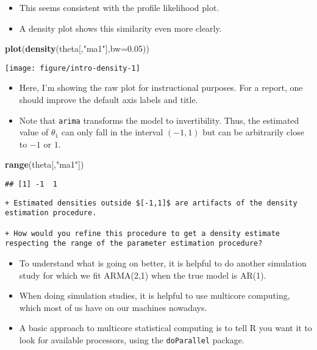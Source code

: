 \documentclass[]{article}
\newenvironment{Shaded}{\begin{snugshade}}{\end{snugshade}}
\newcommand{\KeywordTok}[1]{\textcolor[rgb]{0.13,0.29,0.53}{\textbf{#1}}}
\newcommand{\DataTypeTok}[1]{\textcolor[rgb]{0.13,0.29,0.53}{#1}}
\newcommand{\FloatTok}[1]{\textcolor[rgb]{0.00,0.00,0.81}{#1}}
\newcommand{\StringTok}[1]{\textcolor[rgb]{0.31,0.60,0.02}{#1}}
\newcommand{\NormalTok}[1]{#1}
\begin{document}
\begin{itemize}
\item
  This seems consistent with the profile likelihood plot.
\item
  A density plot shows this similarity even more clearly.
\end{itemize}

\begin{Shaded}
\begin{Highlighting}[]
\KeywordTok{plot}\NormalTok{(}\KeywordTok{density}\NormalTok{(theta[,}\StringTok{"ma1"}\NormalTok{],}\DataTypeTok{bw=}\FloatTok{0.05}\NormalTok{))}
\end{Highlighting}
\end{Shaded}

\begin{center}\texttt{[image: figure/intro-density-1]} \end{center}

\begin{itemize}
\item
  Here, I'm showing the raw plot for instructional purposes. For a
  report, one should improve the default axis labels and title.
\item
  Note that \texttt{arima} transforms the model to invertibility. Thus,
  the estimated value of \(\theta_1\) can only fall in the interval
  \((-1,1)\) but can be arbitrarily close to \(-1\) or \(1\).
\end{itemize}

\begin{Shaded}
\begin{Highlighting}[]
\KeywordTok{range}\NormalTok{(theta[,}\StringTok{"ma1"}\NormalTok{])}
\end{Highlighting}
\end{Shaded}

\begin{verbatim}
## [1] -1  1
\end{verbatim}

\begin{verbatim}
+ Estimated densities outside $[-1,1]$ are artifacts of the density estimation procedure. 

+ How would you refine this procedure to get a density estimate respecting the range of the parameter estimation procedure?
\end{verbatim}

\begin{itemize}
\item
  To understand what is going on better, it is helpful to do another
  simulation study for which we fit ARMA(2,1) when the true model is
  AR(1).
\item
  When doing simulation studies, it is helpful to use multicore
  computing, which most of us have on our machines nowadays.
\item
  A basic approach to multicore statistical computing is to tell R you
  want it to look for available processors, using the
  \texttt{doParallel} package.
\end{itemize}
\end{document}
